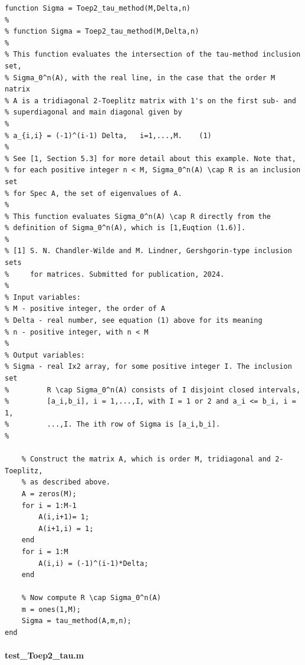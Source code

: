 \documentclass[preprint,1p,11pt]{elsarticle}
\numberwithin{equation}{section}   %
\numberwithin{figure}{section}  %
\begin{document}
\begin{verbatim}
function Sigma = Toep2_tau_method(M,Delta,n)
%
% function Sigma = Toep2_tau_method(M,Delta,n)
%
% This function evaluates the intersection of the tau-method inclusion set, 
% Sigma_0^n(A), with the real line, in the case that the order M natrix
% A is a tridiagonal 2-Toeplitz matrix with 1's on the first sub- and 
% superdiagonal and main diagonal given by
% 
% a_{i,i} = (-1)^(i-1) Delta,   i=1,...,M.    (1)
% 
% See [1, Section 5.3] for more detail about this example. Note that, 
% for each positive integer n < M, Sigma_0^n(A) \cap R is an inclusion set 
% for Spec A, the set of eigenvalues of A. 
% 
% This function evaluates Sigma_0^n(A) \cap R directly from the
% definition of Sigma_0^n(A), which is [1,Euqtion (1.6)].
%
% [1] S. N. Chandler-Wilde and M. Lindner, Gershgorin-type inclusion sets
%     for matrices. Submitted for publication, 2024.
%
% Input variables:
% M - positive integer, the order of A
% Delta - real number, see equation (1) above for its meaning
% n - positive integer, with n < M
%
% Output variables:
% Sigma - real Ix2 array, for some positive integer I. The inclusion set
%         R \cap Sigma_0^n(A) consists of I disjoint closed intervals,
%         [a_i,b_i], i = 1,...,I, with I = 1 or 2 and a_i <= b_i, i = 1,
%         ...,I. The ith row of Sigma is [a_i,b_i].
%

    % Construct the matrix A, which is order M, tridiagonal and 2-Toeplitz, 
    % as described above.
    A = zeros(M);
    for i = 1:M-1
        A(i,i+1)= 1;
        A(i+1,i) = 1;
    end
    for i = 1:M
        A(i,i) = (-1)^(i-1)*Delta;
    end

    % Now compute R \cap Sigma_0^n(A)
    m = ones(1,M);
    Sigma = tau_method(A,m,n);
end
\end{verbatim}

\paragraph{test\_Toep2\_tau.m}
\end{document}
